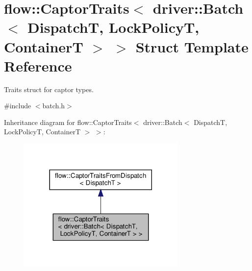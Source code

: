 \hypertarget{structflow_1_1_captor_traits_3_01driver_1_1_batch_3_01_dispatch_t_00_01_lock_policy_t_00_01_container_t_01_4_01_4}{}\section{flow\+:\+:Captor\+Traits$<$ driver\+:\+:Batch$<$ DispatchT, Lock\+PolicyT, ContainerT $>$ $>$ Struct Template Reference}
\label{structflow_1_1_captor_traits_3_01driver_1_1_batch_3_01_dispatch_t_00_01_lock_policy_t_00_01_container_t_01_4_01_4}


Traits struct for captor types.  




{\ttfamily \#include $<$batch.\+h$>$}



Inheritance diagram for flow\+:\+:Captor\+Traits$<$ driver\+:\+:Batch$<$ DispatchT, Lock\+PolicyT, ContainerT $>$ $>$\+:
\nopagebreak
\begin{figure}[H]
\begin{center}
\leavevmode
\includegraphics[width=236pt]{structflow_1_1_captor_traits_3_01driver_1_1_batch_3_01_dispatch_t_00_01_lock_policy_t_00_01_conta2660d5fdeed71557319522ab1bb531c}
\end{center}
\end{figure}


